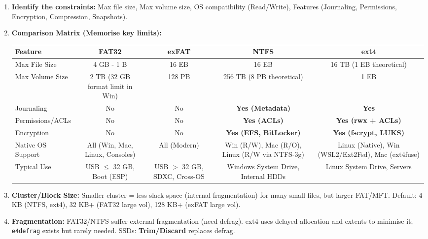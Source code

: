\documentclass[11pt]{article}
\newcommand{\cle}[1]{{\popxbold\color{popdark}#1}}
\begin{document}
\begin{methode}
\begin{enumerate}
\item \textbf{Identify the constraints:} Max file size, Max volume size, OS compatibility (Read/Write), Features (Journaling, Permissions, Encryption, Compression, Snapshots).
\item \textbf{Comparison Matrix (Memorise key limits):}
\begin{center}
\begin{tabular}{|l|c|c|c|c|}
\hline
\rowcolor{popblueL}
\textbf{Feature} & \textbf{FAT32} & \textbf{exFAT} & \textbf{NTFS} & \textbf{ext4} \\
\hline
Max File Size & 4 GB - 1 B & 16 EB & 16 EB & 16 TB (1 EB theoretical) \\
Max Volume Size & 2 TB (32 GB format limit in Win) & 128 PB & 256 TB (8 PB theoretical) & 1 EB \\
Journaling & No & No & \textbf{Yes (Metadata)} & \textbf{Yes} \\
Permissions/ACLs & No & No & \textbf{Yes (ACLs)} & \textbf{Yes (rwx + ACLs)} \\
Encryption & No & No & \textbf{Yes (EFS, BitLocker)} & \textbf{Yes (fscrypt, LUKS)} \\
Native OS Support & All (Win, Mac, Linux, Consoles) & All (Modern) & Win (R/W), Mac (R/O), Linux (R/W via NTFS-3g) & Linux (Native), Win (WSL2/Ext2Fsd), Mac (ext4fuse) \\
Typical Use & USB $\le$ 32 GB, Boot (ESP) & USB $>$ 32 GB, SDXC, Cross-OS & Windows System Drive, Internal HDDs & Linux System Drive, Servers \\
\hline
\end{tabular}
\end{center}
\item \textbf{Cluster/Block Size:} Smaller cluster = less \cle{slack space} (internal fragmentation) for many small files, but larger FAT/MFT. Default: 4 KB (NTFS, ext4), 32 KB+ (FAT32 large vol), 128 KB+ (exFAT large vol).
\item \textbf{Fragmentation:} FAT32/NTFS suffer external fragmentation (need defrag). ext4 uses \cle{delayed allocation} and \cle{extents} to minimise it; \texttt{e4defrag} exists but rarely needed. SSDs: \textbf{Trim/Discard} replaces defrag.
\end{enumerate}
\end{methode}
\end{document}

